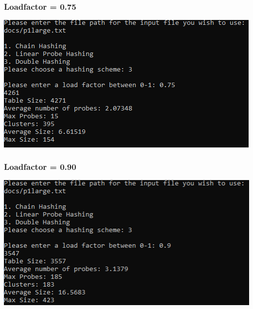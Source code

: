\documentclass[titlepage]{article}
\begin{document}
\subsubsection{Loadfactor = 0.75}
\includegraphics[]{Large_Input/LF_0_75/DoubleHash.png}
\subsubsection{Loadfactor = 0.90}
\includegraphics[]{Large_Input/LF_0_90/DoubleHash.png}
\end{document}
